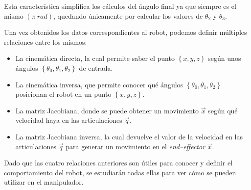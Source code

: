Esta característica simplifica los cálculos del ángulo final ya que siempre es el mismo
$\left(\pi~rad\right)$, quedando únicamente por calcular los valores de $\theta_2$ y 
$\theta_3$.

Una vez obtenidos los datos correspondientes al robot, podemos definir múltiples 
relaciones entre los mismos:
\begin{itemize}
    \item La cinemática directa, la cual permite saber el punto $\left\{x, y, z\right\}$
          según unos ángulos $\left\{\theta_0, \theta_1, \theta_2\right\}$ de entrada.
    \item La cinemática inversa, que permite conocer qué ángulos 
          $\left\{\theta_0, \theta_1, \theta_2\right\}$ posicionan el robot en un punto
          $\left\{x, y, z\right\}$.
    \item La matriz Jacobiana, donde se puede obtener un movimiento $\overrightarrow{x}$ según 
          qué velocidad haya en las articulaciones $\overrightarrow{q}$.
    \item La matriz Jacobiana inversa, la cual devuelve el valor de la velocidad en
          las articulaciones $\overrightarrow{q}$ para generar un movimiento en el 
          \textit{end--effector} $\overrightarrow{x}$.
\end{itemize}

Dado que las cuatro relaciones anteriores son útiles para conocer y definir
el comportamiento del robot, se estudiarán todas ellas para ver cómo se pueden utilizar
en el manipulador.